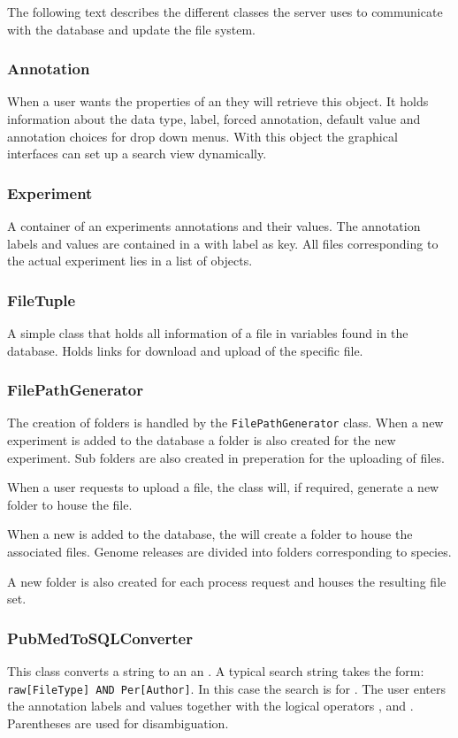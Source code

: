 The following text describes the different classes the server uses to communicate with the database and update the file system.

\subsubsection{Annotation}
When a user wants the properties of an  they will retrieve this object. It holds information about the data type, label, forced annotation, default value and annotation choices for drop down menus. With this object the graphical interfaces can set up a search view dynamically.

\subsubsection{Experiment}
A container of an experiments annotations and their values. The annotation labels and values are contained in a  with label as key. All files corresponding to the actual experiment lies in a list of  objects.

\subsubsection{FileTuple}
A simple class that holds all information of a file in variables found in the database. Holds links for download and upload of the specific file.

\subsubsection{FilePathGenerator}
The creation of folders is handled by the \texttt{FilePathGenerator} class. When a new experiment is added to the database a folder is also created for the new experiment. Sub folders are also created in preperation for the uploading of files.

When a user requests to upload a file, the  class will, if required, generate a new folder to house the file. 

When a new  is added to the database, the  will create a folder to house the associated files. Genome releases are divided into folders corresponding to species.

A new folder is also created for each process request and houses the resulting file set.

\subsubsection{PubMedToSQLConverter}
This class converts a  string to an an . A typical  search string takes the form: \texttt{raw[FileType] AND Per[Author]}. In this case the search is for . The user enters the annotation labels and values together with the logical operators ,  and . Parentheses are used for disambiguation. 

